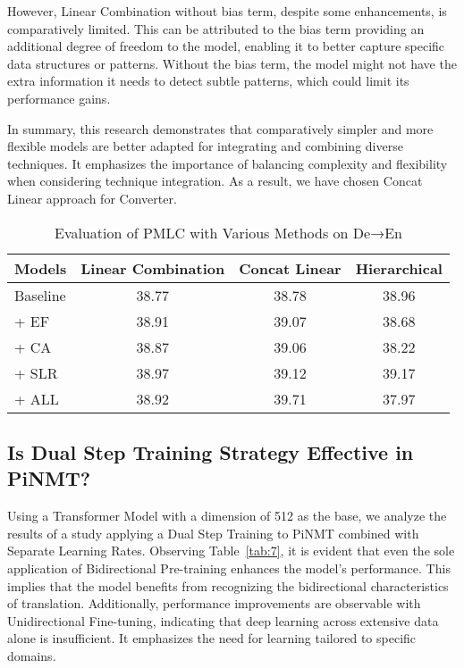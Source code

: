 \documentclass[conference]{IEEEtran}
\begin{document}
However, Linear Combination without bias term, despite some enhancements, is comparatively limited. This can be attributed to the bias term providing an additional degree of freedom to the model, enabling it to better capture specific data structures or patterns. Without the bias term, the model might not have the extra information it needs to detect subtle patterns, which could limit its performance gains.

In summary, this research demonstrates that comparatively simpler and more flexible models are better adapted for integrating and combining diverse techniques. It emphasizes the importance of balancing complexity and flexibility when considering technique integration. As a result, we have chosen Concat Linear approach for Converter.

\begin{table}[!tb]
\renewcommand{\arraystretch}{1.3}
\caption{Evaluation of PMLC with Various Methods on De→En}
\label{tab:6}
\centering
\begin{tabular}{|l|c|c|c|}
\hline
\textbf{Models} & \textbf{Linear Combination} & \textbf{Concat Linear} & \textbf{Hierarchical} \\
\hline
Baseline & 38.77 & 38.78 & 38.96 \\
+ EF & 38.91 & 39.07 & 38.68 \\
+ CA & 38.87 & 39.06 & 38.22 \\
+ SLR & 38.97 & 39.12 & 39.17 \\
\hline
+ ALL & 38.92 & 39.71 & 37.97 \\
\hline
\end{tabular}
\end{table}


\subsection{Is Dual Step Training Strategy Effective in PiNMT?}
Using a Transformer Model with a dimension of 512 as the base, we analyze the results of a study applying a Dual Step Training to PiNMT combined with Separate Learning Rates. Observing Table~\ref{tab:7}, it is evident that even the sole application of Bidirectional Pre-training enhances the model's performance. This implies that the model benefits from recognizing the bidirectional characteristics of translation. Additionally, performance improvements are observable with Unidirectional Fine-tuning, indicating that deep learning across extensive data alone is insufficient. It emphasizes the need for learning tailored to specific domains.
\end{document}
